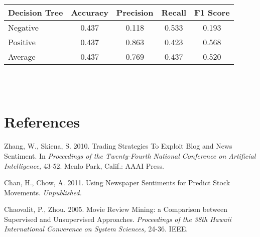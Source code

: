 \documentclass[letterpaper]{article}
\begin{document}
{\noindent\begin{tabular}{C{2cm} | c c c c}
\textbf{Decision Tree}   & Accuracy  & Precision & Recall    & F1 Score  \\
\hline
Negative        & 0.437     & 0.118     & 0.533     & 0.193     \\
Positive        & 0.437     & 0.863     & 0.423     & 0.568     \\
Average         & 0.437     & 0.769     & 0.437     & 0.520     \\
\end{tabular} \\ \\
}
\section{References}

\smallskip \noindent Zhang, W., Skiena, S. 2010. Trading Strategies To Exploit Blog and News Sentiment. In \textit{Proceedings of the Twenty-Fourth National Conference on Artificial Intelligence,} 43-52. Menlo Park, Calif.: AAAI Press. 

\smallskip \noindent Chan, H., Chow, A. 2011. Using Newspaper Sentiments for Predict Stock Movements. \textit{Unpublished.}

\smallskip \noindent Chaovalit, P., Zhou. 2005. Movie Review Mining: a Comparison between Supervised and Unsupervised Approaches. \textit{Proceedings of the 38th Hawaii International Converence on System Sciences,} 24-36. IEEE.
\end{document}

